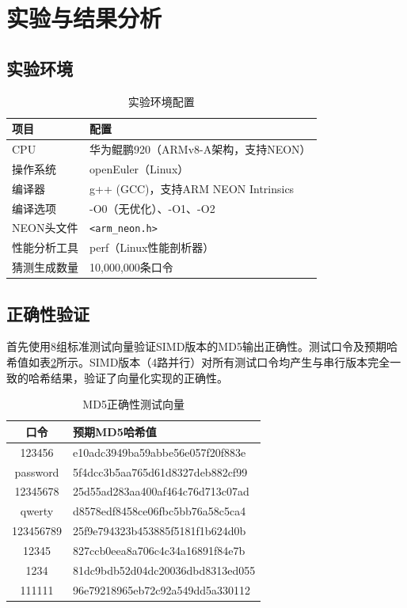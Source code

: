 \documentclass[UTF8,a4paper,10pt]{ctexart}
\begin{document}
\section{实验与结果分析}

\subsection{实验环境}

\begin{table}[!htbp]
  \centering
  \begin{tabular}{ll}
  \toprule
  项目 & 配置 \\
  \midrule
  CPU & 华为鲲鹏920（ARMv8-A架构，支持NEON） \\
  操作系统 & openEuler（Linux） \\
  编译器 & g++ (GCC)，支持ARM NEON Intrinsics \\
  编译选项 & -O0（无优化）、-O1、-O2 \\
  NEON头文件 & \texttt{<arm\_neon.h>} \\
  性能分析工具 & perf（Linux性能剖析器） \\
  猜测生成数量 & 10,000,000条口令 \\
  \bottomrule
  \end{tabular}
  \caption{实验环境配置}
  \label{tab:env}
\end{table}

\subsection{正确性验证}

首先使用8组标准测试向量验证SIMD版本的MD5输出正确性。测试口令及预期哈希值如表\ref{tab:correctness}所示。SIMD版本（4路并行）对所有测试口令均产生与串行版本完全一致的哈希结果，验证了向量化实现的正确性。

\begin{table}[!htbp]
  \centering
  \begin{tabular}{cl}
  \toprule
  口令 & 预期MD5哈希值 \\
  \midrule
  123456 & e10adc3949ba59abbe56e057f20f883e \\
  password & 5f4dcc3b5aa765d61d8327deb882cf99 \\
  12345678 & 25d55ad283aa400af464c76d713c07ad \\
  qwerty & d8578edf8458ce06fbc5bb76a58c5ca4 \\
  123456789 & 25f9e794323b453885f5181f1b624d0b \\
  12345 & 827ccb0eea8a706c4c34a16891f84e7b \\
  1234 & 81dc9bdb52d04dc20036dbd8313ed055 \\
  111111 & 96e79218965eb72c92a549dd5a330112 \\
  \bottomrule
  \end{tabular}
  \caption{MD5正确性测试向量}
  \label{tab:correctness}
\end{table}
\end{document}
